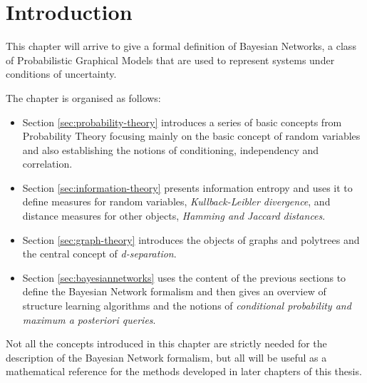 \section{Introduction} \label{sec:mathematical-background-introduction}
This chapter will arrive to give a formal definition of Bayesian Networks, a class of Probabilistic Graphical Models that are used to represent systems under conditions of uncertainty.

The chapter is organised as follows:
\begin{itemize}
  \item Section \ref{sec:probability-theory} introduces a series of basic concepts from Probability Theory focusing mainly on the basic concept of random variables and also establishing the notions of conditioning, independency and correlation.
  \item Section \ref{sec:information-theory} presents information entropy and uses it to define measures for random variables, \textit{Kullback-Leibler divergence}, and distance measures for other objects, \textit{Hamming and Jaccard distances}.
  \item Section \ref{sec:graph-theory} introduces the objects of graphs and polytrees and the central concept of \textit{d-separation}.
  \item Section \ref{sec:bayesiannetworks} uses the content of the previous sections to define the Bayesian Network formalism and then gives an overview of structure learning algorithms and the notions of \textit{conditional probability and maximum a posteriori queries}.
\end{itemize}

Not all the concepts introduced in this chapter are strictly needed for the description of the Bayesian Network formalism, but all will be useful as a mathematical reference for the methods developed in later chapters of this thesis.